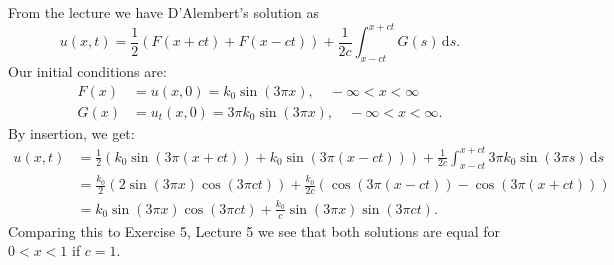 \begin{derivation}
  From the lecture we have D'Alembert's solution as
  \[ 
  u(x,t) = \frac{1}{2} \left( F(x+ct) + F(x-ct) \right) + \frac{1}{2c} \int_{x - ct}^{x + ct} G(s) \, \mathrm{d}s
  .\]
  Our initial conditions are:
  \begin{align*}
    F(x) &= u(x,0) = k_0 \sin (3\pi x), \quad - \infty < x < \infty \\
    G(x) &= u_t(x,0) = 3 \pi k_0 \sin (3 \pi x), \quad - \infty < x < \infty
  .\end{align*}
  By insertion, we get:
  \begin{align*}
    u(x,t) &= \frac{1}{2} \left( k_0 \sin \left( 3 \pi \left( x + ct \right) \right )+ k_0 \sin \left( 3 \pi \left( x - ct \right) \right) \right) + \frac{1}{2c} \int_{x - ct}^{x + ct} 3 \pi k_0 \sin \left( 3 \pi s \right) \, \mathrm{d}s\\
    &= \frac{k_0}{2} \left( 2 \sin \left( 3 \pi x \right) \cos \left( 3 \pi ct \right) \right) + \frac{k_0}{2c} \left( \cos \left( 3\pi \left( x - ct \right) \right) - \cos \left( 3\pi \left( x + ct \right) \right) \right) \\
    &= k_0 \sin \left( 3 \pi x \right) \cos \left( 3 \pi ct \right) + \frac{k_0}{c} \sin \left( 3 \pi x \right) \sin \left( 3 \pi ct \right)
  .\end{align*}
  Comparing this to Exercise 5, Lecture 5 we see that both solutions are equal for $0 < x < 1$ if $c = 1$.
\end{derivation}

\newpage
